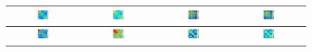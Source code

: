 \begin{figure}[thp]
\begin{tabular}{|cc|cc|}
    \includegraphics[width=0.24\textwidth]{figures/cos_simmat_dino_2.png}\label{fig:f4} &
    \includegraphics[width=0.24\textwidth]{figures/cos_simmat_gvit_2.png}\label{fig:f4} &
    \includegraphics[width=0.24\textwidth]{figures/cos_simmat_dino_3.png} &
    \includegraphics[width=0.24\textwidth]{figures/cos_simmat_gvit_3.png}\label{fig:f4} \\
    
    \midrule
    
    \includegraphics[width=0.24\textwidth]{figures/cos_simmat_dino_4.png}\label{fig:f4} &
    \includegraphics[width=0.24\textwidth]{figures/cos_simmat_gvit_4.png}\label{fig:f4} &
    \includegraphics[width=0.24\textwidth]{figures/cos_simmat_dino_5.png} &
    \includegraphics[width=0.24\textwidth]{figures/cos_simmat_gvit_5.png}\label{fig:f4} \\
    

\end{tabular}
\end{figure}
